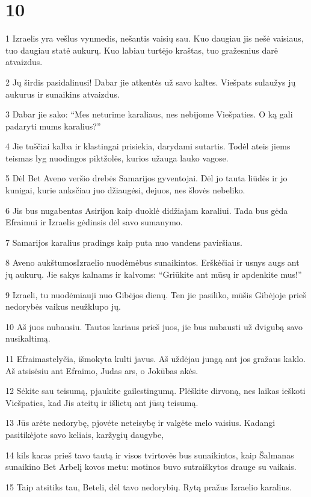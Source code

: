 \chapter{10}


\par 1 Izraelis yra vešlus vynmedis, nešantis vaisių sau. Kuo daugiau jis nešė vaisiaus, tuo daugiau statė aukurų. Kuo labiau turtėjo kraštas, tuo gražesnius darė atvaizdus. 
\par 2 Jų širdis pasidalinusi! Dabar jie atkentės už savo kaltes. Viešpats sulaužys jų aukurus ir sunaikins atvaizdus. 
\par 3 Dabar jie sako: “Mes neturime karaliaus, nes nebijome Viešpaties. O ką gali padaryti mums karalius?” 
\par 4 Jie tuščiai kalba ir klastingai prisiekia, darydami sutartis. Todėl ateis jiems teismas lyg nuodingos piktžolės, kurios užauga lauko vagose. 
\par 5 Dėl Bet Aveno veršio drebės Samarijos gyventojai. Dėl jo tauta liūdės ir jo kunigai, kurie anksčiau juo džiaugėsi, dejuos, nes šlovės nebeliko. 
\par 6 Jis bus nugabentas Asirijon kaip duoklė didžiajam karaliui. Tada bus gėda Efraimui ir Izraelis gėdinsis dėl savo sumanymo. 
\par 7 Samarijos karalius pradings kaip puta nuo vandens paviršiaus. 
\par 8 Aveno aukštumos­Izraelio nuodėmė­bus sunaikintos. Erškėčiai ir usnys augs ant jų aukurų. Jie sakys kalnams ir kalvoms: “Griūkite ant mūsų ir apdenkite mus!” 
\par 9 Izraeli, tu nuodėmiauji nuo Gibėjos dienų. Ten jie pasiliko, mūšis Gibėjoje prieš nedorybės vaikus neužklupo jų. 
\par 10 Aš juos nubausiu. Tautos kariaus prieš juos, jie bus nubausti už dvigubą savo nusikaltimą. 
\par 11 Efraimas­telyčia, išmokyta kulti javus. Aš uždėjau jungą ant jos gražaus kaklo. Aš atsisėsiu ant Efraimo, Judas ars, o Jokūbas akės. 
\par 12 Sėkite sau teisumą, pjaukite gailestingumą. Plėškite dirvoną, nes laikas ieškoti Viešpaties, kad Jis ateitų ir išlietų ant jūsų teisumą. 
\par 13 Jūs arėte nedorybę, pjovėte neteisybę ir valgėte melo vaisius. Kadangi pasitikėjote savo keliais, karžygių daugybe, 
\par 14 kils karas prieš tavo tautą ir visos tvirtovės bus sunaikintos, kaip Šalmanas sunaikino Bet Arbelį kovos metu: motinos buvo sutraiškytos drauge su vaikais. 
\par 15 Taip atsitiks tau, Beteli, dėl tavo nedorybių. Rytą pražus Izraelio karalius.



